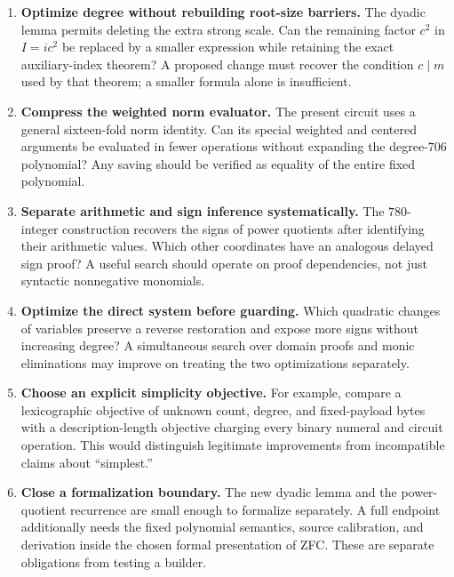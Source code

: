 \documentclass[11pt,letterpaper]{article}
\theoremstyle{definition}
\theoremstyle{remark}
\numberwithin{equation}{section}
\begin{document}
\begin{enumerate}[leftmargin=*]
\item \textbf{Optimize degree without rebuilding root-size barriers.}
The dyadic lemma permits deleting the extra strong scale. Can the
remaining factor $c^2$ in $I=ic^2$ be replaced by a smaller expression
while retaining the exact auxiliary-index theorem? A proposed change
must recover the condition $c\mid m$ used by that theorem; a smaller
formula alone is insufficient.

\item \textbf{Compress the weighted norm evaluator.}
The present circuit uses a general sixteen-fold norm identity.
Can its special weighted and centered arguments be evaluated in fewer
operations without expanding the degree-$706$ polynomial? Any saving
should be verified as equality of the entire fixed polynomial.

\item \textbf{Separate arithmetic and sign inference systematically.}
The $780$-integer construction recovers the signs of power quotients
after identifying their arithmetic values. Which other coordinates have
an analogous delayed sign proof? A useful search should operate on
proof dependencies, not just syntactic nonnegative monomials.

\item \textbf{Optimize the direct system before guarding.}
Which quadratic changes of variables preserve a reverse restoration
and expose more signs without increasing degree? A simultaneous search
over domain proofs and monic eliminations may improve on treating the
two optimizations separately.

\item \textbf{Choose an explicit simplicity objective.}
For example, compare a lexicographic objective of unknown count, degree,
and fixed-payload bytes with a description-length objective charging
every binary numeral and circuit operation. This would distinguish
legitimate improvements from incompatible claims about ``simplest.''

\item \textbf{Close a formalization boundary.}
The new dyadic lemma and the power-quotient recurrence are small enough
to formalize separately. A full endpoint additionally needs the fixed
polynomial semantics, source calibration, and derivation inside the
chosen formal presentation of ZFC. These are separate obligations from
testing a builder.
\end{enumerate}
\end{document}
